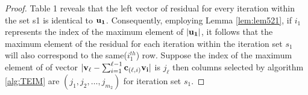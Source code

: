 \documentclass{article}
\begin{document}
\begin{proof}
\begin{table}[]
\caption{Residual matrix for the iterations of Iteration set $s_1$}
\label{tab:table1}
\end{table}
Table 1 reveals that the left vector of residual for every iteration within the set s1 is identical to $\bold{u_1}$. Consequently, employing Lemma \ref{lem:lem521}, if $i_1$ represents the index of the maximum element of $\lvert \bold{u_1} \rvert$, it follows that the maximum element of the residual for each iteration within the iteration set $s_1$ will also correspond to the same($i_1^{th}$) row. Suppose the index of the maximum element of of vector $\lvert\bold{v_\ell} -\sum_{i=1}^{\ell-1}\bold{c}_{(\bold{\ell},i)}\bold{v_i}\rvert$ is $j_\ell$ then columns selected by algorithm \ref{alg:TEIM} are $(j_1,j_2,\dots,j_{m_2})$ for iteration set $s_1$.


\end{proof}
\end{document}
